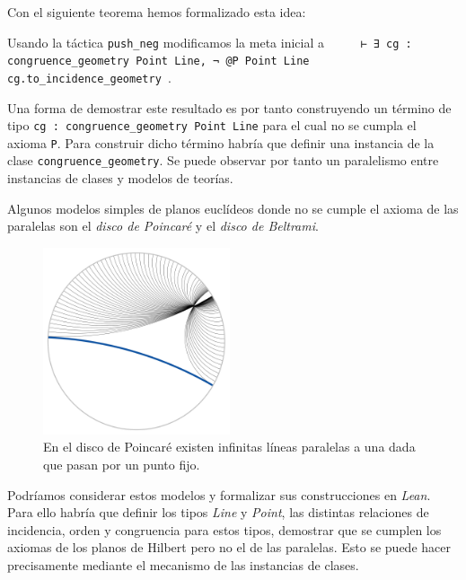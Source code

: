 Con el siguiente teorema hemos formalizado esta idea:


Usando la táctica \lstinline{push_neg} modificamos la meta inicial a
\lstinline{
	⊢ ∃ cg : congruence_geometry Point Line, ¬ @P Point Line cg.to_incidence_geometry
}.


Una forma de demostrar este resultado es por tanto construyendo un término de
tipo \lstinline{cg : congruence_geometry Point Line} para el cual no se cumpla
el axioma \lstinline{P}.
Para construir dicho término habría que definir una instancia de la clase
\lstinline{congruence_geometry}. Se puede observar por tanto un paralelismo
entre instancias de clases y modelos de teorías.

Algunos modelos simples de planos euclídeos donde no se cumple el axioma de las
paralelas son el \textit{disco de Poincaré} y el \textit{disco de Beltrami}.

\begin{figure}[htbp]
	\centerline{\includegraphics[width=5.5cm]{./imgs/Poincare_disc_hyperbolic_parallel_lines.png}}
	\caption*{En el disco de Poincaré existen infinitas líneas paralelas a una
		dada que pasan por un punto fijo.}
	\label{figure:poincare}
\end{figure}

Podríamos considerar estos modelos y formalizar sus construcciones en \textit{Lean}.
Para ello habría que definir los tipos \textit{Line} y \textit{Point}, las
distintas relaciones de incidencia, orden y congruencia para estos tipos,
demostrar que se cumplen los axiomas de los planos de Hilbert pero no el de las
paralelas. Esto se puede hacer precisamente mediante el mecanismo de las
instancias de clases.








